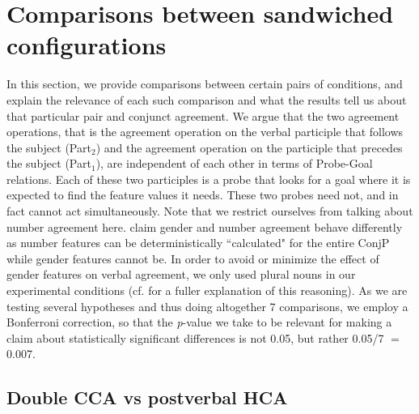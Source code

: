 \documentclass[output=paper
,modfonts
,nonflat]{langsci/langscibook}
\begin{document}
\section{Comparisons between sandwiched configurations}

In this section, we provide comparisons between certain pairs of conditions, and explain the relevance of each such comparison and what the results tell us about that particular pair and conjunct agreement. We argue that the two agreement operations, that is the agreement operation on the verbal participle that follows the subject (Part$_2$) and the agreement operation on the participle that precedes the subject (Part$_1$), are independent of each other in terms of Probe-Goal relations. Each of these two participles is a probe that looks for a goal where it is expected to find the feature values it needs. These two probes need not, and in fact cannot act simultaneously. Note that we restrict ourselves from talking about number agreement here. \cite{marusicnevinsbadecker:15} claim gender and number agreement behave differently as number features can be deterministically ``calculated" for the entire ConjP while gender features cannot be. In order to avoid or minimize the effect of gender features on verbal agreement, we only used plural nouns in our experimental conditions (cf. \citealt{marusicnevinsbadecker:15} for a fuller explanation of this reasoning). As we are testing several hypotheses and thus doing altogether 7 comparisons, we employ a Bonferroni correction, so that the \textsl{p}-value we take to be relevant for making a claim about statistically significant differences is not 0.05, but rather 0.05/7 $=$ 0.007.

\subsection{Double CCA vs postverbal HCA}
\end{document}
